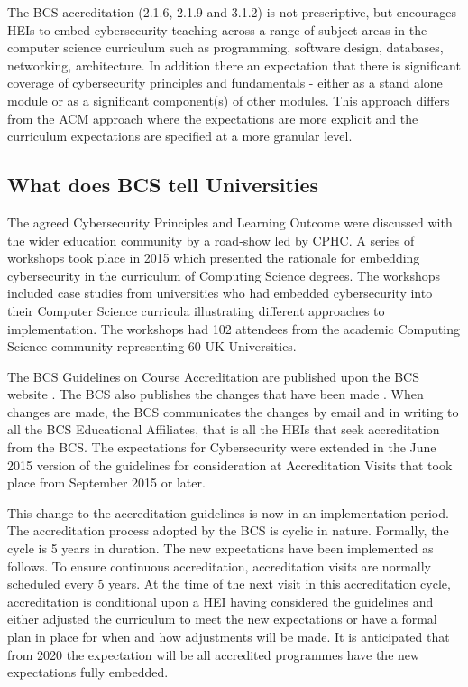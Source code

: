 \documentclass[conference]{IEEEtran}
\begin{document}
The BCS accreditation (2.1.6, 2.1.9 and 3.1.2) is not prescriptive, but encourages HEIs to embed cybersecurity teaching across a range of subject areas in the computer science curriculum such as programming, software design, databases, networking, architecture. In addition there an expectation that there is significant coverage of cybersecurity principles and fundamentals - either as a stand alone module or as a significant component(s) of other modules. This approach differs from the ACM approach where the expectations are more explicit and the curriculum expectations are specified at a more granular level.


\subsection{What does BCS tell Universities}
The agreed Cybersecurity Principles and Learning Outcome \cite{CPHCISC2} were discussed with the wider education community by a road-show led by CPHC. A series of workshops took place in 2015 which presented the rationale for embedding cybersecurity in the curriculum of Computing Science degrees. The workshops included case studies from universities who had embedded cybersecurity into their Computer Science curricula illustrating different approaches to implementation. The workshops had 102 attendees from the academic Computing Science community representing 60 UK Universities. 

The BCS Guidelines on Course Accreditation are published upon the BCS website \cite{BCS2018a}. The BCS also publishes the changes that have been made \cite{BCS2018b}. When changes are made, the BCS communicates the changes by email and in writing to all the BCS Educational Affiliates, that is all the HEIs that seek accreditation from the BCS. The expectations for Cybersecurity were extended in the June 2015 version of the guidelines for consideration at Accreditation Visits that took place from September 2015 or later.

This change to the accreditation guidelines is now in an implementation period. The accreditation process adopted by the BCS is cyclic in nature. Formally, the cycle is 5 years in duration. The new expectations have been implemented as follows. To ensure continuous accreditation, accreditation visits are normally scheduled every 5 years. At the time of the next visit in this accreditation cycle, accreditation is conditional upon a HEI having considered the guidelines and either adjusted the curriculum to meet the new expectations or have a formal plan in place for when and how adjustments will be made.  It is anticipated that from 2020 the expectation will be all accredited programmes have the new expectations fully embedded.
\end{document}
